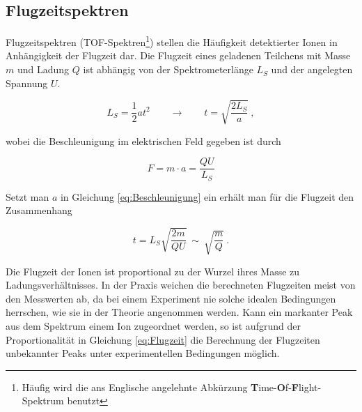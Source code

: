 \subsection{Flugzeitspektren}

Flugzeitspektren (TOF-Spektren\footnote{Häufig wird die ans Englische angelehnte Abkürzung \textbf{T}ime-\textbf{O}f-\textbf{F}light-Spektrum benutzt}) stellen die Häufigkeit detektierter Ionen in Anhängigkeit der Flugzeit dar. Die Flugzeit eines geladenen Teilchens mit Masse $m$ und Ladung $Q$ ist abhängig von der Spektrometerlänge $L_S$ und der angelegten Spannung $U$.

\begin{equation} \label{eq:Beschleunigung}
L_S = \frac{1}{2}at^2\qquad \rightarrow \qquad t = \sqrt{\frac{2L_S}{a}} \: ,
\end{equation} 

wobei die Beschleunigung im elektrischen Feld gegeben ist durch

\begin{equation}
F = m \cdot a = \frac{QU}{L_S}
\end{equation}

Setzt man $a$ in Gleichung \ref{eq:Beschleunigung} ein erhält man für die Flugzeit den Zusammenhang 

\begin{equation} \label{eq:Flugzeit}
t = L_S \sqrt{\frac{2m}{QU}}\: \sim \: \sqrt{\frac{m}{Q}} \: .
\end{equation}

Die Flugzeit der Ionen ist proportional zu der Wurzel ihres Masse zu Ladungsverhältnisses. In der Praxis weichen die berechneten Flugzeiten meist von den Messwerten ab, da bei einem Experiment nie solche idealen Bedingungen herrschen, wie sie in der Theorie angenommen werden. Kann ein markanter Peak aus dem Spektrum einem Ion zugeordnet werden, so ist aufgrund der Proportionalität in Gleichung \ref{eq:Flugzeit} die Berechnung der Flugzeiten unbekannter Peaks unter experimentellen Bedingungen möglich. %

